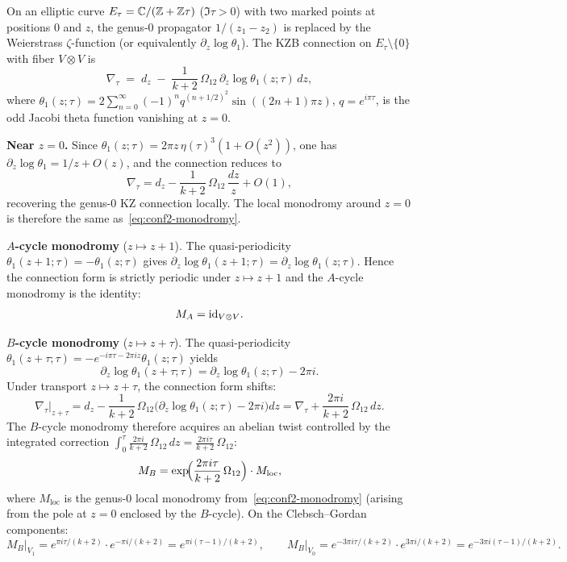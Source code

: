 \begin{computation}
\label{comp:genus1-kzb}
On an elliptic curve $E_\tau=\mathbb C/(\mathbb Z+\mathbb Z\tau)$ ($\Im\tau>0$) with two
marked points at positions $0$ and $z$,
the genus-$0$ propagator $1/(z_1-z_2)$ is replaced by the
Weierstrass $\zeta$-function (or equivalently $\partial_z\log\theta_1$).
The KZB connection on $E_\tau\setminus\{0\}$ with fiber $V\otimes V$ is
\begin{equation}\label{eq:kzb-connection}
 \nabla_\tau \;=\; d_z \;-\; \frac{1}{k+2}\,\Omega_{12}\,
 \partial_z\!\log\theta_1(z;\tau)\,dz,
\end{equation}
where $\theta_1(z;\tau)=2\sum_{n=0}^{\infty}(-1)^n q^{(n+1/2)^2}\sin((2n+1)\pi z)$,
$q=e^{i\pi\tau}$, is the odd Jacobi theta function vanishing at $z=0$.

\medskip\noindent\textbf{Near $z=0$.}\;
Since $\theta_1(z;\tau)=2\pi z\,\eta(\tau)^3(1+O(z^2))$,
one has $\partial_z\log\theta_1=1/z+O(z)$, and the connection reduces to
\[
 \nabla_\tau = d_z - \frac{1}{k+2}\,\Omega_{12}\,\frac{dz}{z}+O(1),
\]
recovering the genus-$0$ KZ connection locally. The local monodromy around
$z=0$ is therefore the same as~\eqref{eq:conf2-monodromy}.

\medskip\noindent\textbf{$A$-cycle monodromy} ($z\mapsto z+1$).\;
The quasi-periodicity $\theta_1(z+1;\tau)=-\theta_1(z;\tau)$ gives
$\partial_z\log\theta_1(z+1;\tau)=\partial_z\log\theta_1(z;\tau)$.
Hence the connection form is strictly periodic under $z\mapsto z+1$
and the $A$-cycle monodromy is the identity:
\begin{equation}\label{eq:A-cycle-monodromy}
 M_A = \mathrm{id}_{V\otimes V}.
\end{equation}

\medskip\noindent\textbf{$B$-cycle monodromy} ($z\mapsto z+\tau$).\;
The quasi-periodicity
$\theta_1(z+\tau;\tau)=-e^{-i\pi\tau-2\pi iz}\theta_1(z;\tau)$ yields
\[
 \partial_z\log\theta_1(z+\tau;\tau)
 = \partial_z\log\theta_1(z;\tau)-2\pi i.
\]
Under transport $z\mapsto z+\tau$, the connection form shifts:
\[
 \nabla_\tau\big|_{z+\tau}
 =
 d_z - \frac{1}{k+2}\,\Omega_{12}\bigl(\partial_z\log\theta_1(z;\tau)-2\pi i\bigr)dz
 =
 \nabla_\tau + \frac{2\pi i}{k+2}\,\Omega_{12}\,dz.
\]
The $B$-cycle monodromy therefore acquires an abelian twist
controlled by the integrated correction $\int_0^\tau \frac{2\pi i}{k+2}\,\Omega_{12}\,dz
= \frac{2\pi i\tau}{k+2}\,\Omega_{12}$:
\begin{equation}\label{eq:B-cycle-monodromy}
 M_B = \exp\!\Bigl(\frac{2\pi i\tau}{k+2}\,\Omega_{12}\Bigr)
 \cdot M_{\mathrm{loc}},
\end{equation}
where $M_{\mathrm{loc}}$ is the genus-$0$ local monodromy from~\eqref{eq:conf2-monodromy}
(arising from the pole at $z=0$ enclosed by the $B$-cycle).
On the Clebsch--Gordan components:
\[
 M_B\big|_{V_1} = e^{\pi i\tau/(k+2)}\cdot e^{-\pi i/(k+2)}
 = e^{\pi i(\tau-1)/(k+2)},
 \qquad
 M_B\big|_{V_0} = e^{-3\pi i\tau/(k+2)}\cdot e^{3\pi i/(k+2)}
 = e^{-3\pi i(\tau-1)/(k+2)}.
\]


\end{computation}
